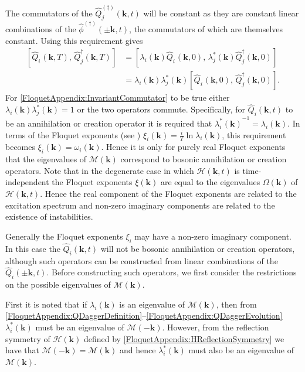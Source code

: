 The commutators of the $\hat{Q}_j^{(\dagger)}(\bm{k}, t)$ will be constant as they are constant linear combinations of the $\hat{\phi}^{(\dagger)}(\pm\bm{k}, t)$, the commutators of which are themselves constant. Using this requirement gives
\begin{align}
    \left[ \hat{Q}_i^{\phantom{\dagger}}(\bm{k}, T),\, \hat{Q}_j^\dagger(\bm{k}, T) \right] &= \left[ \lambda_i(\bm{k}) \hat{Q}_i^{\phantom{\dagger}}(\bm{k}, 0),\, \lambda_j^*(\bm{k}) \hat{Q}_j^\dagger(\bm{k}, 0)\right]\\
        &= \lambda_i(\bm{k}) \lambda_j^*(\bm{k}) \left[ \hat{Q}_i^{\phantom{\dagger}}(\bm{k}, 0),\, \hat{Q}_j^\dagger(\bm{k}, 0)\right].
        \label{FloquetAppendix:InvariantCommutator}
\end{align}
For \eqref{FloquetAppendix:InvariantCommutator} to be true either $\lambda_i(\bm{k}) \lambda_j^*(\bm{k}) = 1$ or the two operators commute. Specifically, for $\hat{Q}_i(\bm{k}, t)$ to be an annihilation or creation operator it is required that ${\lambda_i^*(\bm{k})}^{-1} = \lambda_i(\bm{k})$. In terms of the Floquet exponents (see ) $\displaystyle \xi_i(\bm{k}) = \frac{i}{T} \ln \lambda_i(\bm{k})$, this requirement becomes $\xi_i(\bm{k}) = \omega_i(\bm{k})$. Hence it is only for purely real Floquet exponents that the eigenvalues of $\mathcal{M}(\bm{k})$ correspond to bosonic annihilation or creation operators. Note that in the degenerate case in which $\mathcal{H}(\bm{k}, t)$ is time-independent the Floquet exponents $\xi(\bm{k})$ are equal to the eigenvalues $\Omega(\bm{k})$ of $\mathcal{H}(\bm{k}, t)$. Hence the real component of the Floquet exponents are related to the excitation spectrum and non-zero imaginary components are related to the existence of instabilities.

Generally the Floquet exponents $\xi_i$ may have a non-zero imaginary component. In this case the $\hat{Q}_i(\bm{k}, t)$ will not be bosonic annihilation or creation operators, although such operators can be constructed from linear combinations of the $\hat{Q}_i(\pm\bm{k}, t)$. Before constructing such operators, we first consider the restrictions on the possible eigenvalues of $\mathcal{M}(\bm{k})$.

First it is noted that if $\lambda_i(\bm{k})$ is an eigenvalue of $\mathcal{M}(\bm{k})$, then from \eqref{FloquetAppendix:QDaggerDefinition}--\eqref{FloquetAppendix:QDaggerEvolution} $\lambda_i^*(\bm{k})$ must be an eigenvalue of $\mathcal{M}(-\bm{k})$. However, from the reflection symmetry of $\mathcal{H}(\bm{k})$ defined by \eqref{FloquetAppendix:HReflectionSymmetry} we have that $\mathcal{M}(-\bm{k}) = \mathcal{M}(\bm{k})$ and hence $\lambda_i^*(\bm{k})$ must also be an eigenvalue of $\mathcal{M}(\bm{k})$.

